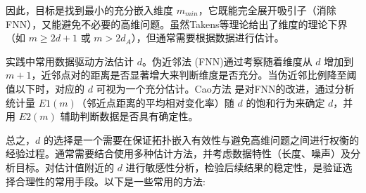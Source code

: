 因此，目标是找到最小的充分嵌入维度 $m_{min}$，它既能完全展开吸引子（消除FNN），又能避免不必要的高维问题。虽然Takens等理论给出了维度的理论下界（如 $m \ge 2d+1$ 或 $m > 2d_A$），但通常需要根据数据进行估计。

实践中常用数据驱动方法估计 $d$。伪近邻法 (FNN)\cite{rhodes1997false}通过考察随着维度从 $d$ 增加到 $m+1$，近邻点对的距离是否显著增大来判断维度是否充分。当伪近邻比例降至阈值以下时，对应的 $d$ 可视为一个充分估计。Cao方法\cite{cao1997practical} 是对FNN的改进，通过分析统计量 $E1(m)$（邻近点距离的平均相对变化率）随 $d$ 的饱和行为来确定 $d$，并用 $E2(m)$ 辅助判断数据是否具有确定性。

总之，$d$ 的选择是一个需要在保证拓扑嵌入有效性与避免高维问题之间进行权衡的经验过程。通常需要结合使用多种估计方法，并考虑数据特性（长度、噪声）及分析目标。对估计值附近的 $d$ 进行敏感性分析，检验后续结果的稳定性，是验证选择合理性的常用手段。以下是一些常用的方法:
\newpage

